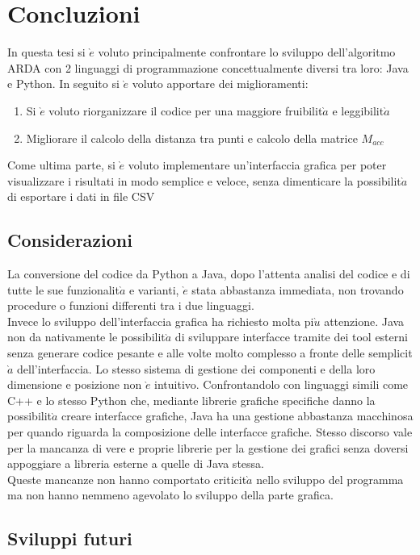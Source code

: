 \chapter{Concluzioni}
In questa tesi si $\grave{e}$ voluto principalmente confrontare lo sviluppo dell'algoritmo
ARDA con 2 linguaggi di programmazione concettualmente diversi tra loro: Java e Python.
In seguito si $\grave{e}$ voluto apportare dei miglioramenti:
\begin{enumerate}
    \item Si $\grave{e}$ voluto riorganizzare il codice per una maggiore fruibilit$\grave{a}$ e leggibilit$\grave{a}$
    \item Migliorare il calcolo della distanza tra punti e calcolo della matrice $M_{acc}$
\end{enumerate}
Come ultima parte, si $\grave{e}$ voluto implementare un'interfaccia grafica per poter visualizzare
i risultati in modo semplice e veloce, senza dimenticare la possibilit$\grave{a}$ di esportare i
dati in file CSV

\section{Considerazioni}
La conversione del codice da Python a Java, dopo l'attenta analisi del codice e di tutte
le sue funzionalit$\grave{a}$ e varianti, $\grave{e}$ stata abbastanza immediata, non trovando procedure o
funzioni differenti tra i due linguaggi.\\
Invece lo sviluppo dell'interfaccia grafica ha richiesto molta pi$\grave{u}$ attenzione.
Java non da nativamente le possibilit$\grave{a}$ di sviluppare interfacce tramite dei tool esterni
senza generare codice pesante e alle volte molto complesso a fronte delle semplicit$\grave{a}$ dell'interfaccia.
Lo stesso sistema di gestione dei componenti e della loro dimensione e posizione non $\grave{e}$
intuitivo. Confrontandolo con linguaggi simili come C++ e lo stesso Python che, mediante
librerie grafiche specifiche danno la possibilit$\grave{a}$ creare interfacce grafiche, Java ha una
gestione abbastanza macchinosa per quando riguarda la composizione delle interfacce grafiche.
Stesso discorso vale per la mancanza di vere e proprie librerie per la gestione dei grafici
senza doversi appoggiare a libreria esterne a quelle di Java stessa.\\
Queste mancanze non hanno comportato criticit$\grave{a}$ nello sviluppo del programma ma non hanno
nemmeno agevolato lo sviluppo della parte grafica.

\section{Sviluppi futuri}
